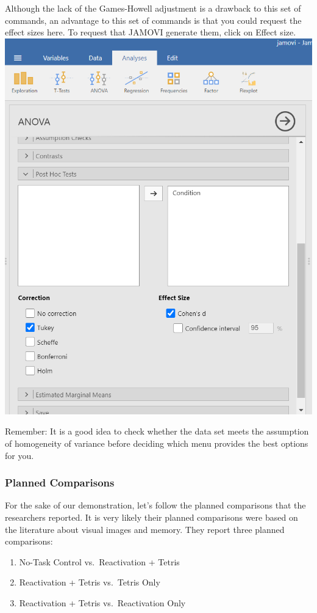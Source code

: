 \documentclass[
]{book}
\begin{document}
Although the lack of the Games-Howell adjustment is a drawback to this set of commands, an advantage to this set of commands is that you could request the effect sizes here. To request that JAMOVI generate them, click on {Effect size}.
\includegraphics{img/ANOVAPostHocAndEffectSize.png}

Remember: It is a good idea to check whether the data set meets the assumption of homogeneity of variance before deciding which menu provides the best options for you.

\hypertarget{planned-comparisons-1}{%
\subsubsection{Planned Comparisons}\label{planned-comparisons-1}}

For the sake of our demonstration, let's follow the planned comparisons that the researchers reported. It is very likely their planned comparisons were based on the literature about visual images and memory. They report three planned comparisons:

\begin{enumerate}
\def\labelenumi{\arabic{enumi})}
\item
  No-Task Control vs.~Reactivation + Tetris
\item
  Reactivation + Tetris vs.~Tetris Only
\item
  Reactivation + Tetris vs.~Reactivation Only
\end{enumerate}
\end{document}
